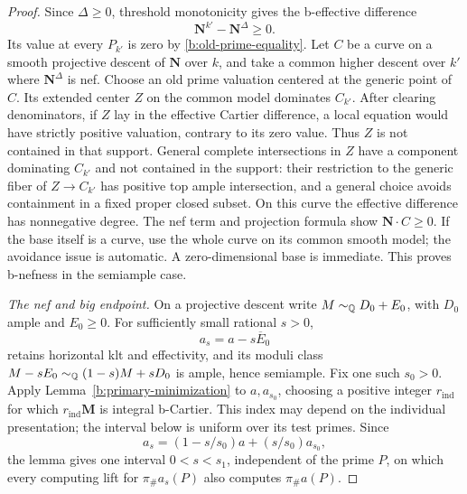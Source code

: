 \begin{proof}
Since \(\Delta\ge0\), threshold monotonicity gives the b-effective
difference
\[
                         \mathbf N^{k'}-\mathbf N^\Delta\ge0.
\]
Its value at every \(P_{k'}\) is zero by
\eqref{b:old-prime-equality}. Let \(C\) be a curve on a smooth
projective descent of \(\mathbf N\) over \(k\), and take a common
higher descent over \(k'\) where \(\mathbf N^\Delta\) is nef.
Choose an old prime valuation centered at the generic point of \(C\).
Its extended center \(Z\) on the common model dominates \(C_{k'}\).
After clearing denominators, if \(Z\) lay in the effective Cartier
difference, a local equation would have strictly positive valuation,
contrary to its zero value. Thus \(Z\) is not contained in that
support. General complete intersections in \(Z\) have a component
dominating \(C_{k'}\) and not contained in the support: their
restriction to the generic fiber of \(Z\to C_{k'}\) has positive
top ample intersection, and a general choice avoids containment in
a fixed proper closed subset. On this curve the effective difference
has nonnegative degree. The nef term and projection formula show
\(\mathbf N\cdot C\ge0\). If the base itself is a curve, use the
whole curve on its common smooth model; the avoidance issue is
automatic. A zero-dimensional base is immediate.
This proves b-nefness in the semiample case.

\medskip\noindent
\emph{The nef and big endpoint.}
On a projective descent write \(M\sim_\mathbb Q D_0+E_0\), with \(D_0\)
ample and \(E_0\ge0\). For sufficiently small rational \(s>0\),
\[
                           a_s=a-s\overline E_0
\]
retains horizontal klt and effectivity, and its moduli class
\(M-sE_0\sim_\mathbb Q(1-s)M+sD_0\) is ample, hence semiample.
Fix one such \(s_0>0\). Apply Lemma~\ref{b:primary-minimization}
to \(a,a_{s_0}\), choosing a positive integer \(r_{\mathrm{ind}}\) for
which \(r_{\mathrm{ind}}\mathbf M\) is integral b-Cartier. This index may
depend on the individual presentation; the interval below is uniform over
its test primes.
Since
\[
 a_s=(1-s/s_0)a+(s/s_0)a_{s_0},
\]
the lemma gives one interval \(0<s<s_1\), independent of the
prime \(P\), on which every computing lift for
\(\pi_\#a_s(P)\) also computes \(\pi_\#a(P)\).


\end{proof}
